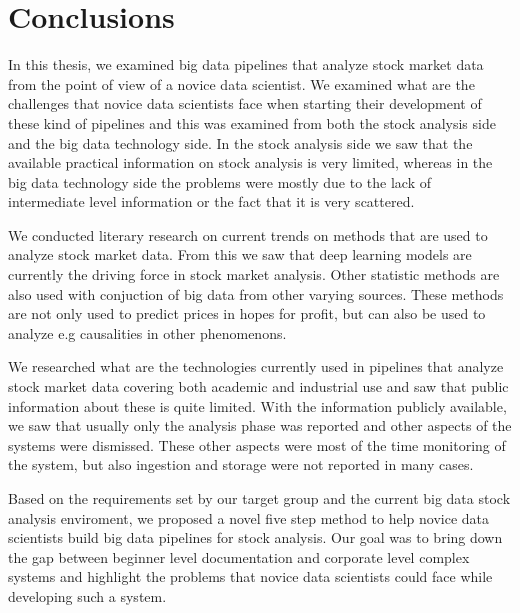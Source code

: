 \chapter{Conclusions}
\label{chapter:conclusions}



In this thesis, we examined big data pipelines that analyze stock market data from the point of view of a novice data scientist.
We examined what are the challenges that novice data scientists face when starting their development of these kind of pipelines and this was examined from both the stock analysis side and the big data technology side.
In the stock analysis side we saw that the available practical information on stock analysis is very limited, whereas in the big data technology side the problems were mostly due to the lack of intermediate level information or the fact that it is very scattered.

We conducted literary research on current trends on methods that are used to analyze stock market data.
From this we saw that deep learning models are currently the driving force in stock market analysis.
Other statistic methods are also used with conjuction of big data from other varying sources.
These methods are not only used to predict prices in hopes for profit, but can also be used to analyze e.g causalities in other phenomenons.

We researched what are the technologies currently used in pipelines that analyze stock market data covering both academic and industrial use and saw that public information about these is quite limited.
With the information publicly available, we saw that usually only the analysis phase was reported and other aspects of the systems were dismissed.
These other aspects were most of the time monitoring of the system, but also ingestion and storage were not reported in many cases.

Based on the requirements set by our target group and the current big data stock analysis enviroment, we proposed a novel five step method to help novice data scientists build big data pipelines for stock analysis.
Our goal was to bring down the gap between beginner level documentation and corporate level complex systems and highlight the problems that novice data scientists could face while developing such a system.

